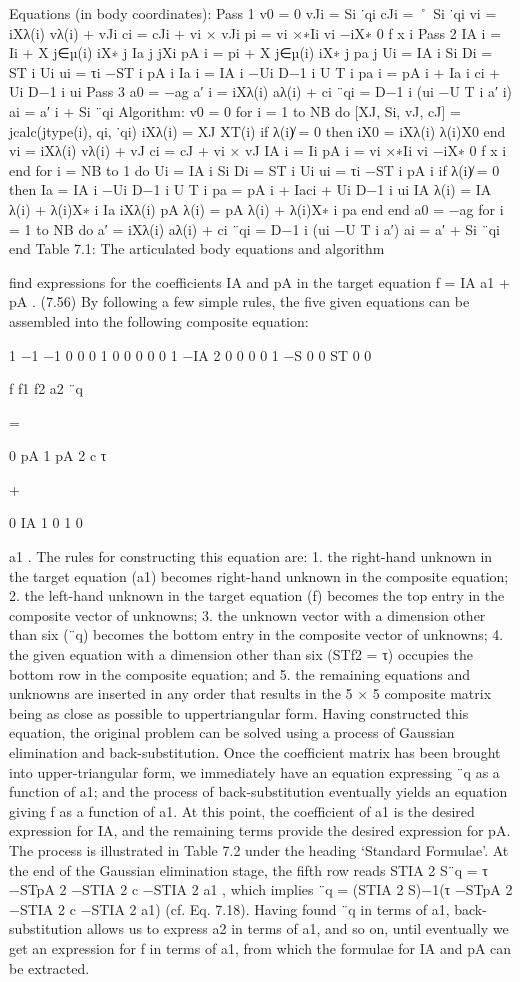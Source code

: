 Equations (in body coordinates): Pass 1 v0 = 0 vJi = Si ˙qi cJi = ˚ Si ˙qi vi = iXλ(i) vλ(i) + vJi ci = cJi + vi × vJi pi = vi ×∗Ii vi −iX∗ 0 f x i Pass 2 IA i = Ii + X j∈µ(i) iX∗ j Ia j jXi pA i = pi + X j∈µ(i) iX∗ j pa j Ui = IA i Si Di = ST i Ui ui = τi −ST i pA i Ia i = IA i −Ui D−1 i U T i pa i = pA i + Ia i ci + Ui D−1 i ui Pass 3 a0 = −ag a′ i = iXλ(i) aλ(i) + ci ¨qi = D−1 i (ui −U T i a′ i) ai = a′ i + Si ¨qi Algorithm: v0 = 0 for i = 1 to NB do [XJ, Si, vJ, cJ] = jcalc(jtype(i), qi, ˙qi) iXλ(i) = XJ XT(i) if λ(i)̸ = 0 then iX0 = iXλ(i) λ(i)X0 end vi = iXλ(i) vλ(i) + vJ ci = cJ + vi × vJ IA i = Ii pA i = vi ×∗Ii vi −iX∗ 0 f x i end for i = NB to 1 do Ui = IA i Si Di = ST i Ui ui = τi −ST i pA i if λ(i)̸ = 0 then Ia = IA i −Ui D−1 i U T i pa = pA i + Iaci + Ui D−1 i ui IA λ(i) = IA λ(i) + λ(i)X∗ i Ia iXλ(i) pA λ(i) = pA λ(i) + λ(i)X∗ i pa end end a0 = −ag for i = 1 to NB do a′ = iXλ(i) aλ(i) + ci ¨qi = D−1 i (ui −U T i a′) ai = a′ + Si ¨qi end Table 7.1: The articulated body equations and algorithm

find expressions for the coefficients IA and pA in the target equation f = IA a1 + pA . (7.56) By following a few simple rules, the five given equations can be assembled into the following composite equation:

1 −1 −1 0 0 0 1 0 0 0 0 0 1 −IA 2 0 0 0 0 1 −S 0 0 ST 0 0

f f1 f2 a2 ¨q

=

0 pA 1 pA 2 c τ

+

0 IA 1 0 1 0

a1 . The rules for constructing this equation are: 1. the right-hand unknown in the target equation (a1) becomes right-hand unknown in the composite equation; 2. the left-hand unknown in the target equation (f) becomes the top entry in the composite vector of unknowns; 3. the unknown vector with a dimension other than six (¨q) becomes the bottom entry in the composite vector of unknowns; 4. the given equation with a dimension other than six (STf2 = τ) occupies the bottom row in the composite equation; and 5. the remaining equations and unknowns are inserted in any order that results in the 5 × 5 composite matrix being as close as possible to uppertriangular form. Having constructed this equation, the original problem can be solved using a process of Gaussian elimination and back-substitution. Once the coefficient matrix has been brought into upper-triangular form, we immediately have an equation expressing ¨q as a function of a1; and the process of back-substitution eventually yields an equation giving f as a function of a1. At this point, the coefficient of a1 is the desired expression for IA, and the remaining terms provide the desired expression for pA. The process is illustrated in Table 7.2 under the heading ‘Standard Formulae’. At the end of the Gaussian elimination stage, the fifth row reads STIA 2 S¨q = τ −STpA 2 −STIA 2 c −STIA 2 a1 , which implies ¨q = (STIA 2 S)−1(τ −STpA 2 −STIA 2 c −STIA 2 a1) (cf. Eq. 7.18). Having found ¨q in terms of a1, back-substitution allows us to express a2 in terms of a1, and so on, until eventually we get an expression for f in terms of a1, from which the formulae for IA and pA can be extracted.

